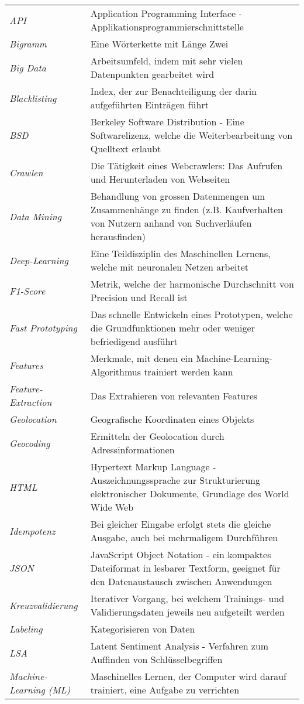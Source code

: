 \begin{table}[H]
	\begin{tabular}{>{\em}p{4cm}p{12cm}}
		API & Application Programming Interface - Applikationsprogrammierschnittstelle\\
		Bigramm & Eine Wörterkette mit Länge Zwei\\
		Big Data & Arbeitsumfeld, indem mit sehr vielen Datenpunkten gearbeitet wird\\
		Blacklisting & Index, der zur Benachteiligung der darin aufgeführten Einträgen führt\\
		BSD & Berkeley Software Distribution - Eine Softwarelizenz, welche die Weiterbearbeitung von Quelltext erlaubt\\
		Crawlen & Die Tätigkeit eines Webcrawlers: Das Aufrufen und Herunterladen von Webseiten\\
		Data Mining & Behandlung von grossen Datenmengen um Zusammenhänge zu finden (z.B. Kaufverhalten von Nutzern anhand von Suchverläufen herausfinden)\\
		Deep-Learning & Eine Teildisziplin des Maschinellen Lernens, welche mit neuronalen Netzen arbeitet\\
		F1-Score & Metrik, welche der harmonische Durchschnitt von Precision und Recall ist\\
		Fast Prototyping & Das schnelle Entwickeln eines Prototypen, welche die Grundfunktionen mehr oder weniger befriedigend ausführt\\
		Features & Merkmale, mit denen ein Machine-Learning-Algorithmus trainiert werden kann\\
		Feature-Extraction & Das Extrahieren von relevanten Features\\
		Geolocation & Geografische Koordinaten eines Objekts\\
		Geocoding & Ermitteln der Geolocation durch Adressinformationen\\
		HTML & Hypertext Markup Language - Auszeichnungssprache zur Strukturierung elektronischer Dokumente, Grundlage des World Wide Web\\
		Idempotenz & Bei gleicher Eingabe erfolgt stets die gleiche Ausgabe, auch bei mehrmaligem Durchführen\\
		JSON & JavaScript Object Notation - ein kompaktes Dateiformat in lesbarer Textform, geeignet für den Datenaustausch zwischen Anwendungen\\
		Kreuzvalidierung & Iterativer Vorgang, bei welchem Trainings- und Validierungsdaten jeweils neu aufgeteilt werden\\
		Labeling & Kategorisieren von Daten\\
		LSA & Latent Sentiment Analysis - Verfahren zum Auffinden von Schlüsselbegriffen\\
		Machine-Learning (ML) & Maschinelles Lernen, der Computer wird darauf trainiert, eine Aufgabe zu verrichten\\	
	\end{tabular}
\end{table}
